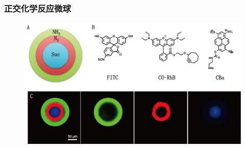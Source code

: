 \documentclass{beamer}
\begin{document}
\begin{frame}
  \frametitle{正交化学反应微球}
  \begin{figure}
    \begin{center}
      \includegraphics[width=\linewidth]{figures/ch3/chemoorthognal.png}
    \end{center}
  \end{figure}
\end{frame}
\end{document}
